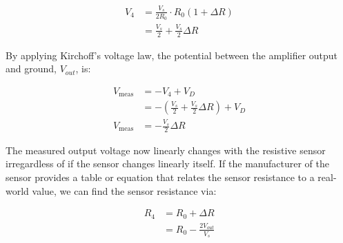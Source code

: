 \begin{align*}
    V_4 &= \frac{V_s}{2R_0} \cdot R_0(1+\Delta R) \\
        &= \frac{V_s}{2} + \frac{V_s}{2} \Delta R
\end{align*}

By applying Kirchoff's voltage law, the potential between the amplifier output and ground, $V_{out} $, is:

\begin{align*}
    V_{\text{meas}} &= -V_4 + V_D \\
            &= -\left( \frac{V_s}{2} + \frac{V_s}{2} \Delta R\right) + V_D \\
    V_{\text{meas}} &= -\frac{V_s}{2} \Delta R
\end{align*}

The measured output voltage now linearly changes with the resistive sensor irregardless of if the sensor changes linearly itself.
If the manufacturer of the sensor provides a table or equation that relates the sensor resistance to a real-world value, we can find the sensor resistance via:

\begin{align*}
    R_4 &= R_0 + \Delta R \\
        &= R_0 - \frac{2V_{out}}{V_s}
\end{align*}